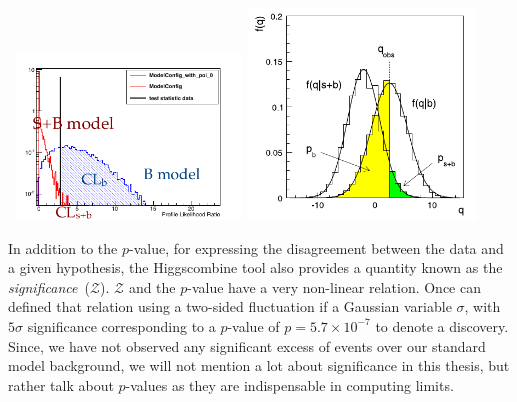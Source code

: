 \vspace{5mm}
\begin{minipage}{0.94\textwidth} 
\begin{center}
\mbox{
\includegraphics[height=0.65\textwidth, width=0.45\textwidth]{THESISPLOTS/Asymptotics_Test_Stats.png}
\includegraphics[height=0.615\textwidth, width=0.45\textwidth]{THESISPLOTS/TEST_STATISTICS.png}
}
\label{fig:LIM}
\end{center}
\end{minipage}

\vspace{5mm}
In addition to the $p$-value, for expressing the disagreement between the data and a given hypothesis, the Higgscombine tool also provides a quantity known as the \textit{significance}~($\mathcal{Z}$). $\mathcal{Z}$ and the $p$-value have a very non-linear relation. Once can defined that relation using a two-sided fluctuation if a Gaussian variable $\sigma$, with $5\sigma$ significance corresponding to a $p$-value of $p = 5.7 \times 10^{-7}$ to denote a discovery. Since, we have not observed any significant excess of events over our standard model background, we will not mention a lot about significance in this thesis, but rather talk about $p$-values as they are indispensable in computing limits.


